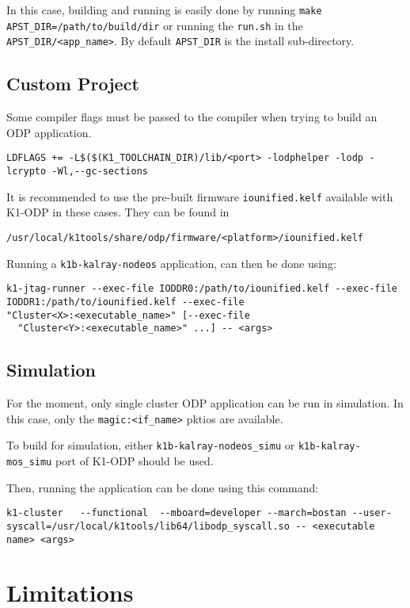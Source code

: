 \documentclass{trkalray}
\begin{document}
In this case, building and running is easily done by running
\texttt{make APST\_DIR=/path/to/build/dir} or running the
\texttt{run.sh} in the \texttt{APST\_DIR/<app\_name>}.
By default \texttt{APST\_DIR} is the install sub-directory.


\subsection{Custom Project}

Some compiler flags must be passed to the compiler when trying to
build an ODP application.
\begin{lstlisting}
LDFLAGS += -L$($(K1_TOOLCHAIN_DIR)/lib/<port> -lodphelper -lodp -lcrypto -Wl,--gc-sections
\end{lstlisting}

It is recommended to use the pre-built firmware
\texttt{iounified.kelf} available with K1-ODP in these cases.
They can be found in
\begin{lstlisting}
/usr/local/k1tools/share/odp/firmware/<platform>/iounified.kelf
\end{lstlisting}

Running a \texttt{k1b-kalray-nodeos} application, can then be done using:
\begin{lstlisting}
k1-jtag-runner --exec-file IODDR0:/path/to/iounified.kelf --exec-file
IODDR1:/path/to/iounified.kelf --exec-file
"Cluster<X>:<executable_name>" [--exec-file
  "Cluster<Y>:<executable_name>" ...] -- <args>
\end{lstlisting}

\subsection{Simulation}

For the moment, only single cluster ODP application can be run in
simulation. In this case, only the \texttt{magic:<if\_name>} pktios
are available.

To build for simulation, either \texttt{k1b-kalray-nodeos\_simu} or
\texttt{k1b-kalray-mos\_simu} port of K1-ODP should be used.

Then, running the application can be done using this command:
\begin{lstlisting}
k1-cluster   --functional  --mboard=developer --march=bostan --user-syscall=/usr/local/k1tools/lib64/libodp_syscall.so -- <executable name> <args>
\end{lstlisting}

\section{Limitations}
\end{document}

